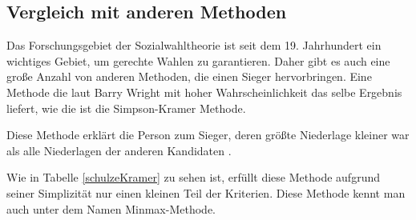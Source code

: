 \subsection{Vergleich mit anderen Methoden}
\label{sec:alternativeAlgorithmen}

Das Forschungsgebiet der Sozialwahltheorie ist seit dem 19. Jahrhundert ein wichtiges Gebiet, um gerechte Wahlen zu garantieren. Daher gibt es auch eine große Anzahl von anderen Methoden, die einen Sieger hervorbringen. Eine Methode die laut Barry Wright \citep{Wright2009} mit hoher Wahrscheinlichkeit das selbe Ergebnis liefert, wie die \schulze ist die Simpson-Kramer Methode.

Diese Methode erklärt die Person zum Sieger, deren größte Niederlage kleiner war als alle Niederlagen der anderen Kandidaten \citep{Nurmi2017}.  

Wie in Tabelle \ref{schulzeKramer} zu sehen ist, erfüllt diese Methode aufgrund seiner Simplizität nur einen kleinen Teil der Kriterien. Diese Methode kennt man auch unter dem Namen Minmax-Methode.

